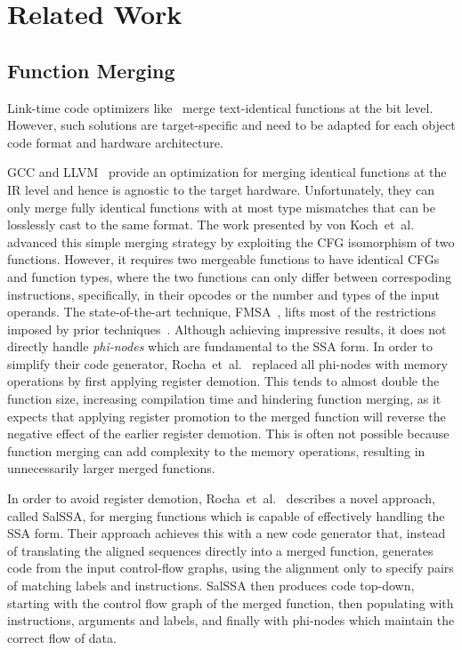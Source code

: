
\section{Related Work}

\subsection{Function Merging}

Link-time code optimizers like~\cite{tallam10,kwan12,msvc-icf} merge text-identical functions at the bit level.
However, such solutions are target-specific and need to be adapted for each object code format and hardware architecture.

GCC and LLVM~\cite{llvm-fm,livska14} provide an optimization for merging identical functions at the IR level and hence is agnostic to the target hardware.
Unfortunately, they can only merge fully identical functions with at most type mismatches that can be losslessly cast to the same format.
The work presented by von Koch~et~al.~\cite{edler14} advanced this simple merging strategy by exploiting the CFG isomorphism of two
functions. However, it requires two mergeable functions to have identical CFGs and function types, where the two functions can only differ
between correspoding instructions, specifically, in their opcodes or the number and types of the input operands.
The state-of-the-art technique, FMSA~\cite{rocha19}, lifts most of the restrictions imposed by prior techniques~\cite{llvm-fm,livska14,edler14}.
Although achieving impressive results, it does not directly handle \textit{phi-nodes} which are fundamental to the SSA form.
In order to simplify their code generator, Rocha~et~al.~\cite{rocha19} replaced all phi-nodes with memory operations by first applying register demotion.
This tends to almost double the function size, increasing compilation time and hindering function merging, as it expects that applying register promotion to the merged function will reverse the negative effect of the earlier register demotion.
This is often not possible because function merging can add complexity to the memory operations, resulting in unnecessarily larger merged functions.

In order to avoid register demotion, Rocha~et~al.~\cite{rocha20} describes a novel approach, called SalSSA, for merging functions which is capable of effectively handling the SSA form.
Their approach achieves this with a new code generator that, instead of translating the aligned sequences directly into a merged function, generates code from the input control-flow graphs, using the alignment only to specify pairs of matching labels and instructions.
SalSSA then produces code top-down, starting with the control flow graph of the merged function, then populating with instructions, arguments and labels, and finally with phi-nodes which maintain the correct flow of data.

